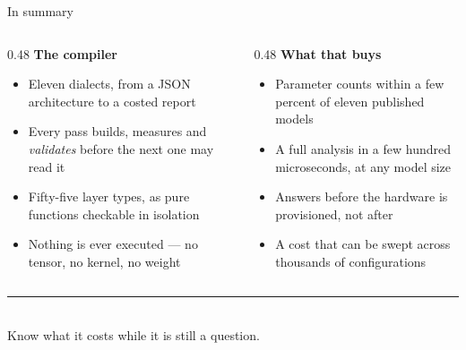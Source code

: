 \documentclass[aspectratio=169,11pt]{beamer}
\begin{document}
\begin{frame}{In summary}{}
  \vspace{0.5cm}
  \begin{columns}[T]
    \begin{column}{0.48\textwidth}
      {\Large\color{nxDeep}\bfseries The compiler}\\[10pt]
      \begin{itemize}\setlength\itemsep{7pt}
        \item Eleven dialects, from a JSON architecture to a costed report
        \item Every pass builds, measures and \emph{validates} before the next
        one may read it
        \item Fifty-five layer types, as pure functions checkable in isolation
        \item Nothing is ever executed --- no tensor, no kernel, no weight
      \end{itemize}
    \end{column}
    \begin{column}{0.48\textwidth}
      {\Large\color{nxFlame}\bfseries What that buys}\\[10pt]
      \begin{itemize}\setlength\itemsep{7pt}
        \item Parameter counts within a few percent of eleven published models
        \item A full analysis in a few hundred microseconds, at any model size
        \item Answers before the hardware is provisioned, not after
        \item A cost that can be swept across thousands of configurations
      \end{itemize}
    \end{column}
  \end{columns}

  \vspace{0.9cm}
  \begin{center}
    \textcolor{nxRule}{\rule{0.5\linewidth}{0.8pt}}\\[10pt]
    {\large\color{nxInk}Know what it costs while it is still a question.}
  \end{center}
\end{frame}
\end{document}
